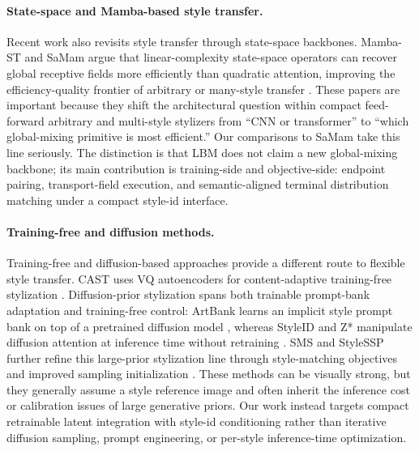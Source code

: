 \documentclass[letterpaper]{article}
\begin{document}
\paragraph{State-space and Mamba-based style transfer.}
Recent work also revisits style transfer through state-space backbones. Mamba-ST and SaMam argue that linear-complexity state-space operators can recover global receptive fields more efficiently than quadratic attention, improving the efficiency-quality frontier of arbitrary or many-style transfer \cite{botti2025mambast,liu2025samam}. These papers are important because they shift the architectural question within compact feed-forward arbitrary and multi-style stylizers from ``CNN or transformer'' to ``which global-mixing primitive is most efficient.'' Our comparisons to SaMam take this line seriously. The distinction is that LBM does not claim a new global-mixing backbone; its main contribution is training-side and objective-side: endpoint pairing, transport-field execution, and semantic-aligned terminal distribution matching under a compact style-id interface.

\paragraph{Training-free and diffusion methods.}
Training-free and diffusion-based approaches provide a different route to flexible style transfer. CAST uses VQ autoencoders for content-adaptive training-free stylization \cite{gim2024cast}. Diffusion-prior stylization spans both trainable prompt-bank adaptation and training-free control: ArtBank learns an implicit style prompt bank on top of a pretrained diffusion model \cite{zhang2024artbank}, whereas StyleID and Z* manipulate diffusion attention at inference time without retraining \cite{chung2024styleid,deng2024zstar}. SMS and StyleSSP further refine this large-prior stylization line through style-matching objectives and improved sampling initialization \cite{jiang2025sms,xu2025stylessp}. These methods can be visually strong, but they generally assume a style reference image and often inherit the inference cost or calibration issues of large generative priors. Our work instead targets compact retrainable latent integration with style-id conditioning rather than iterative diffusion sampling, prompt engineering, or per-style inference-time optimization.
\end{document}
